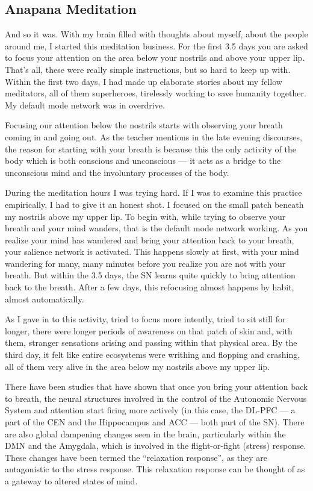 \documentclass[a4paper, amsfonts, amssymb, amsmath, reprint, showkeys, nofootinbib, twoside]{revtex4-1}
\begin{document}
\subsection{Anapana Meditation}

And so it was. With my brain filled with thoughts about myself, about the people
around me, I started this meditation business. For the first 3.5 days you are asked
to focus your attention on the area below your nostrils and above your upper
lip. That's all, these were really simple instructions, but so hard to keep up with.
Within the first two days, I had made up elaborate stories about my
fellow meditators, all of them superheroes, tirelessly working to save humanity
together. My default mode network was in overdrive.

Focusing our attention below the nostrils starts with observing your breath coming in
and going out. As the teacher mentions in the late evening discourses, the reason for
starting with your breath is because this the only activity of the body which is both
conscious and unconscious --- it acts as a bridge to the unconscious mind and the
involuntary processes of the body.

During the meditation hours I was trying hard. If I was to examine this practice
empirically, I had to give it an honest shot. I focused on the small patch beneath my
nostrils above my upper lip. To begin with, while trying to observe your breath and
your mind wanders, that is the default mode network working. As you realize your mind
has wandered and bring your attention back to your breath, your salience network is
activated. This happens slowly at first, with your mind wandering for many, many
minutes before you realize you are not with your breath. But within the 3.5 days, the
SN learns quite quickly to bring attention back to the breath. After a few days, this
refocusing almost happens by habit, almost automatically.

As I gave in to this activity, tried to focus more intently, tried to sit still for
longer, there were longer periods of awareness on that patch of skin and, with them,
stranger sensations arising and passing within that physical area. By the third day,
it felt like entire ecosystems were writhing and flopping and crashing, all of them
very alive in the area below my nostrils above my upper lip.

There have been studies
that have shown that once you bring your attention back to breath, the neural
structures involved in the control of the Autonomic Nervous System and attention
start firing more actively (in this case, the DL-PFC --- a part of the CEN and the
Hippocampus and ACC --- both part of the SN). There are also global dampening changes
seen in the brain, particularly within the DMN and the Amygdala, which is involved in
the flight-or-fight (stress) response. These changes have been
termed the ``relaxation response'', as they are antagonistic to the stress
response. This relaxation response can be thought of as a gateway to altered states
of mind. \cite{relaxationresponse}
\end{document}
